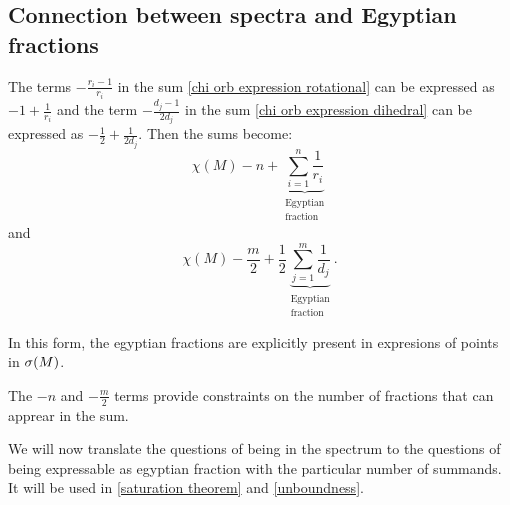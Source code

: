 \subsection{Connection between spectra and Egyptian fractions}\label{Egyptian_fractions}
The terms $-\frac{r_i-1}{r_i}$ in the sum \ref{chi orb expression rotational} 
can be expressed as $-1+ \frac{1}{r_i}$ 
and the term $-\frac{d_j-1}{2d_j}$ in the sum \ref{chi orb expression dihedral} can be expressed as 
$-\frac{1}{2} + \frac{1}{2d_j}$. 
Then the sums become:
\begin{equation}\label{Egyptian S2 sum}
\chi(M) - n + \underbrace{\sum_{i=1}^n \frac{1}{r_i}}_{
\substack{\textrm{Egyptian} \\ \textrm{fraction}}}
\end{equation}
and
\begin{equation}\label{Egyptian D2 sum}
\chi(M) - \frac{m}{2} + \frac{1}{2}
\underbrace{\sum_{j=1}^m \frac{1}{d_j}}_{
\substack{\textrm{Egyptian} \\\textrm{fraction}}}.
\end{equation}

In this form, the egyptian fractions are explicitly present in expresions of 
points in ${{\sigma}(M)}$.

The $-n$ and $-\frac{m}{2}$ terms provide constraints on the number of fractions that 
can apprear in the sum.

We will now translate the questions of being in the spectrum 
to the questions of being expressable as egyptian fraction with the particular number 
of summands. It will be used in \ref{saturation theorem} and \ref{unboundness}.

